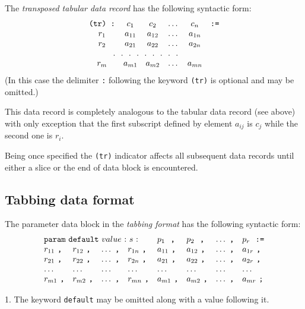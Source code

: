 \documentclass[11pt]{report}
\begin{document}
The {\it transposed tabular data record} has the following syntactic
form:
$$\begin{array}{cccccc}
\mbox{{\tt(tr) :}}&c_1&c_2&\dots&c_n&\mbox{{\tt:=}}\\
r_1&a_{11}&a_{12}&\dots&a_{1n}&\\
r_2&a_{21}&a_{22}&\dots&a_{2n}&\\
\multicolumn{5}{c}{.\ \ .\ \ .\ \ .\ \ .\ \ .\ \ .\ \ .\ \ .}&\\
r_m&a_{m1}&a_{m2}&\dots&a_{mn}&\\
\end{array}$$
(In this case the delimiter {\tt:} following the keyword {\tt(tr)} is
optional and may be omitted.)

This data record is completely analogous to the tabular data record
(see above) with only exception that the first subscript defined by
element $a_{ij}$ is $c_j$ while the second one is $r_i$.

Being once specified the {\tt(tr)} indicator affects all subsequent
data records until either a slice or the end of data block is
encountered.

\newpage

\subsection{Tabbing data format}

The parameter data block in the {\it tabbing format} has the following
syntactic form:
$$
\begin{array}{*{8}{l}}
\multicolumn{4}{l}
{{\tt param}\ {\tt default}\ value\ {\tt :}\ s\ {\tt :}}&
p_1\ \ \verb|,|&p_2\ \ \verb|,|&\dots\ \verb|,|&p_r\ \ \verb|:=|\\
r_{11}\ \verb|,|& r_{12}\ \verb|,|& \dots\ \verb|,|& r_{1n}\ \verb|,|&
a_{11}\ \verb|,|& a_{12}\ \verb|,|& \dots\ \verb|,|& a_{1r}\ \verb|,|\\
r_{21}\ \verb|,|& r_{22}\ \verb|,|& \dots\ \verb|,|& r_{2n}\ \verb|,|&
a_{21}\ \verb|,|& a_{22}\ \verb|,|& \dots\ \verb|,|& a_{2r}\ \verb|,|\\
\dots & \dots & \dots & \dots & \dots & \dots & \dots & \dots \\
r_{m1}\ \verb|,|& r_{m2}\ \verb|,|& \dots\ \verb|,|& r_{mn}\ \verb|,|&
a_{m1}\ \verb|,|& a_{m2}\ \verb|,|& \dots\ \verb|,|& a_{mr}\ \verb|;|\\
\end{array}
$$

1. The keyword {\tt default} may be omitted along with a value
following it.
\end{document}
